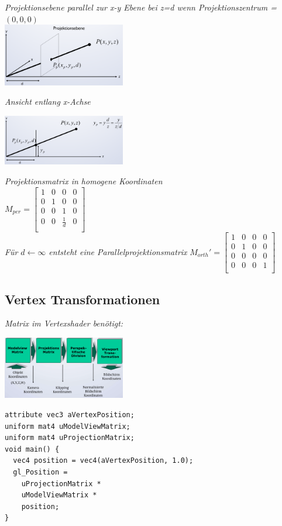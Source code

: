 \textit{Projektionsebene parallel zur x-y Ebene bei z=d wenn Projektionszentrum = $(0,0,0)$} \\

\includegraphics[width=0.4\textwidth]{assets/viewing-projektionsebene.png}

\textit{Ansicht entlang x-Achse}

\includegraphics[width=0.4\textwidth]{assets/viewing-projektionsebene-xachse.png}

\textit{Projektionsmatrix in homogene Koordinaten}\\
$M_{per} = \begin{bmatrix}
    1 & 0 & 0 & 0 \\
    0 & 1 & 0 & 0 \\
    0 & 0 & 1 & 0 \\
    0 & 0 & \frac{1}{d} & 0 \\
\end{bmatrix}$\\

\textit{Für $d \leftarrow \infty$ entsteht eine Parallelprojektionsmatrix}
$M_{orth}' = \begin{bmatrix}
    1 & 0 & 0 & 0 \\
    0 & 1 & 0 & 0 \\
    0 & 0 & 0 & 0 \\
    0 & 0 & 0 & 1 \\
\end{bmatrix}$

\subsection{Vertex Transformationen}

\textit{Matrix im Vertexshader benötigt:}

\includegraphics[width=0.4\textwidth]{assets/vertex-transformation.png}

\begin{lstlisting}
attribute vec3 aVertexPosition;
uniform mat4 uModelViewMatrix;
uniform mat4 uProjectionMatrix;
void main() {
  vec4 position = vec4(aVertexPosition, 1.0);
  gl_Position =
    uProjectionMatrix *
    uModelViewMatrix *
    position;
}
\end{lstlisting}


